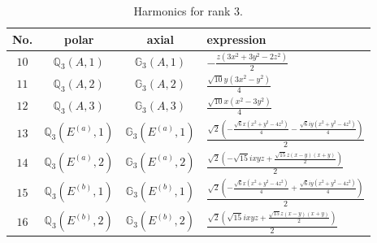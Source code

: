 \documentclass[fleqn,8pt,landscape]{jsarticle}
\begin{document}
\begin{table}[ht!]
\begin{center}
\caption{Harmonics for rank 3.}
\renewcommand{\arraystretch}{1.3}
\begin{tabular}{cccl} \hline \hline
No. & polar & axial & expression \\ \hline
$ 10 $ & $ \mathbb{Q}_{3}(A,1) $ & $ \mathbb{G}_{3}(A,1) $ & $ - \frac{z \left(3 x^{2} + 3 y^{2} - 2 z^{2}\right)}{2} $ \\
$ 11 $ & $ \mathbb{Q}_{3}(A,2) $ & $ \mathbb{G}_{3}(A,2) $ & $ \frac{\sqrt{10} y \left(3 x^{2} - y^{2}\right)}{4} $ \\
$ 12 $ & $ \mathbb{Q}_{3}(A,3) $ & $ \mathbb{G}_{3}(A,3) $ & $ \frac{\sqrt{10} x \left(x^{2} - 3 y^{2}\right)}{4} $ \\
$ 13 $ & $ \mathbb{Q}_{3}(E^{(a)},1) $ & $ \mathbb{G}_{3}(E^{(a)},1) $ & $ \frac{\sqrt{2} \left(- \frac{\sqrt{6} x \left(x^{2} + y^{2} - 4 z^{2}\right)}{4} - \frac{\sqrt{6} i y \left(x^{2} + y^{2} - 4 z^{2}\right)}{4}\right)}{2} $ \\
$ 14 $ & $ \mathbb{Q}_{3}(E^{(a)},2) $ & $ \mathbb{G}_{3}(E^{(a)},2) $ & $ \frac{\sqrt{2} \left(- \sqrt{15} i x y z + \frac{\sqrt{15} z \left(x - y\right) \left(x + y\right)}{2}\right)}{2} $ \\
$ 15 $ & $ \mathbb{Q}_{3}(E^{(b)},1) $ & $ \mathbb{G}_{3}(E^{(b)},1) $ & $ \frac{\sqrt{2} \left(- \frac{\sqrt{6} x \left(x^{2} + y^{2} - 4 z^{2}\right)}{4} + \frac{\sqrt{6} i y \left(x^{2} + y^{2} - 4 z^{2}\right)}{4}\right)}{2} $ \\
$ 16 $ & $ \mathbb{Q}_{3}(E^{(b)},2) $ & $ \mathbb{G}_{3}(E^{(b)},2) $ & $ \frac{\sqrt{2} \left(\sqrt{15} i x y z + \frac{\sqrt{15} z \left(x - y\right) \left(x + y\right)}{2}\right)}{2} $ \\
 \hline \hline
\end{tabular}
\end{center}
\end{table}
\end{document}
